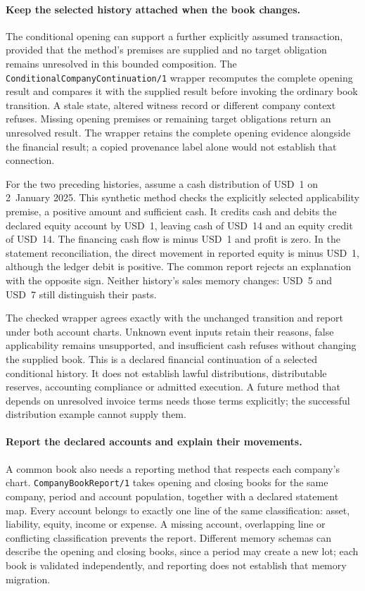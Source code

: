 \paragraph{Keep the selected history attached when the book changes.}
The conditional opening can support a further explicitly assumed transaction,
provided that the method's premises are supplied and no target obligation
remains unresolved in this bounded composition. The
\texttt{ConditionalCompanyContinuation/1} wrapper recomputes the complete
opening result and compares it with the supplied result before invoking the
ordinary book transition. A stale state, altered witness record or different
company context refuses. Missing opening premises or remaining target
obligations return an unresolved result. The wrapper retains the complete
opening evidence alongside the financial result; a copied provenance label
alone would not establish that connection.

For the two preceding histories, assume a cash distribution of USD~1 on
2~January 2025. This synthetic method checks the explicitly selected
applicability premise, a positive amount and sufficient cash. It credits cash
and debits the declared equity account by USD~1, leaving cash of USD~14 and
an equity credit of USD~14. The financing cash flow is minus USD~1 and profit
is zero. In the statement reconciliation, the direct movement in reported
equity is minus USD~1, although the ledger debit is positive. The common
report rejects an explanation with the opposite sign. Neither history's
sales memory changes: USD~5 and USD~7 still distinguish their pasts.

The checked wrapper agrees exactly with the unchanged transition and report
under both account charts. Unknown event inputs retain their reasons, false
applicability remains unsupported, and insufficient cash refuses without
changing the supplied book. This is a declared financial continuation of a
selected conditional history. It does not establish lawful distributions,
distributable reserves, accounting compliance or admitted execution. A future
method that depends on unresolved invoice terms needs those terms explicitly;
the successful distribution example cannot supply them.


\paragraph{Report the declared accounts and explain their movements.}
A common book also needs a reporting method that respects each company's chart.
\texttt{CompanyBookReport/1} takes opening and closing books for the same company,
period and account population, together with a declared statement map. Every
account belongs to exactly one line of the same classification: asset, liability,
equity, income or expense. A missing account, overlapping line or conflicting
classification prevents the report. Different memory schemas can describe the
opening and closing books, since a period may create a new lot; each book is
validated independently, and reporting does not establish that memory migration.

